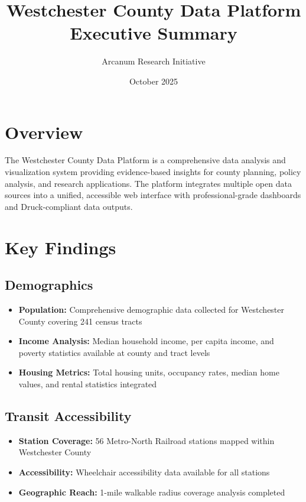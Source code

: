 \documentclass[11pt,letterpaper]{article}
\title{\textbf{Westchester County Data Platform}\\Executive Summary}
\author{Arcanum Research Initiative}
\date{October 2025}
\begin{document}
\maketitle

\section*{Overview}

The Westchester County Data Platform is a comprehensive data analysis and visualization system providing evidence-based insights for county planning, policy analysis, and research applications. The platform integrates multiple open data sources into a unified, accessible web interface with professional-grade dashboards and Druck-compliant data outputs.

\section*{Key Findings}

\subsection*{Demographics}
\begin{itemize}
    \item \textbf{Population:} Comprehensive demographic data collected for Westchester County covering 241 census tracts
    \item \textbf{Income Analysis:} Median household income, per capita income, and poverty statistics available at county and tract levels
    \item \textbf{Housing Metrics:} Total housing units, occupancy rates, median home values, and rental statistics integrated
\end{itemize}

\subsection*{Transit Accessibility}
\begin{itemize}
    \item \textbf{Station Coverage:} 56 Metro-North Railroad stations mapped within Westchester County
    \item \textbf{Accessibility:} Wheelchair accessibility data available for all stations
    \item \textbf{Geographic Reach:} 1-mile walkable radius coverage analysis completed
\end{itemize}
\end{document}

